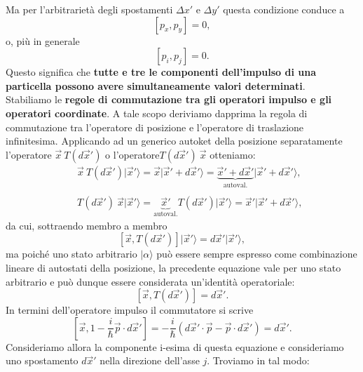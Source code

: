 Ma per l'arbitrarietà degli spostamenti $\Delta x'$ e  $\Delta y'$ questa condizione conduce a
\begin{equation}
\left[p_x , p_y\right] =0,
\end{equation}
o, più in generale
\begin{equation}
\left[p_i , p_j\right] =0.
\end{equation}
Questo significa che \textbf{tutte e tre le componenti dell'impulso di una particella possono avere simultaneamente valori determinati}.\\
Stabiliamo le \textbf{regole di commutazione tra gli operatori impulso e gli operatori coordinate}. A tale scopo deriviamo dapprima la regola di commutazione tra l'operatore di posizione e l'operatore di traslazione infinitesima. Applicando ad un generico autoket della posizione separatamente l'operatore $\vec{x}\ T(d\vec{x}')$ o l'operatore$T(d\vec{x}')\ \vec{x}$ otteniamo:
\begin{eqnarray}
& & \vec{x}\ T(d\vec{x}')\vert \vec{x}' \rangle = \vec{x}\vert\vec{x}'+d\vec{x}'\rangle =\underbrace{\vec{x}'+d\vec{x}'}_{\textrm{autoval.}}\vert\vec{x}'+d\vec{x}'\rangle ,  \\
 \nonumber \\
& & T(d\vec{x}')\ \vec{x} \vert \vec{x}' \rangle = \underbrace{\vec{x}'}_{\textrm{autoval.}} T(d\vec{x}')\vert \vec{x}'\rangle = \vec{x}'\vert \vec{x}'+d\vec{x}'\rangle ,
\end{eqnarray}
da cui, sottraendo membro a membro
\begin{equation}
\left[\vec{x}, T(d\vec{x}')\right]\vert \vec{x}' \rangle = d\vec{x}' \vert \vec{x}' \rangle ,
\end{equation}
ma poiché uno stato arbitrario $\vert \alpha \rangle $ può essere sempre espresso come combinazione lineare di autostati della posizione, la precedente equazione vale per uno stato arbitrario e può dunque essere considerata un'identità operatoriale:
\begin{equation}
\left[\vec{x}, T(d\vec{x}')\right] = d\vec{x}'  .
\end{equation}
In termini dell'operatore impulso il commutatore si scrive
\begin{equation}
\left[ \vec{x}, 1- \frac{i}{\hbar}\vec{p}\cdot d\vec{x}'\right] =-\frac{i}{\hbar}\left(d\vec{x}'\cdot \vec{p}-\vec{p}\cdot d\vec{x}' \right) =d\vec{x}' .
\end{equation}
Consideriamo allora la componente i-esima di questa equazione e consideriamo uno spostamento $d\vec{x}'$ nella direzione dell'asse $j$. Troviamo in tal modo:

